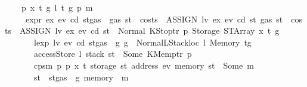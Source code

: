 \begin{isabellebody}
\ \ {\isacharbar}{\kern0pt}\ {\isacharparenleft}{\kern0pt}{}{}{\isacharparenright}{\kern0pt}\ p\ x\ t\ g\ l\ t{\isacharprime}{\kern0pt}\ g{\isacharprime}{\kern0pt}\ p{\isacharprime}{\kern0pt}\ m\isanewline
\ \ \ \ \ {\isachardoublequoteopen}expr\ ex\ ev\ cd\ {\isacharparenleft}{\kern0pt}st{\isasymlparr}gas\ {\isacharcolon}{\kern0pt}{\isacharequal}{\kern0pt}\ gas\ st\ {\isacharminus}{\kern0pt}\ costs\ \ {\isacharparenleft}{\kern0pt}ASSIGN\ lv\ ex{\isacharparenright}{\kern0pt}\ ev\ cd\ st{\isasymrparr}{\isacharparenright}{\kern0pt}\ {\isacharparenleft}{\kern0pt}gas\ st\ {\isacharminus}{\kern0pt}\ costs\ \ {\isacharparenleft}{\kern0pt}ASSIGN\ lv\ ex{\isacharparenright}{\kern0pt}\ ev\ cd\ st{\isacharparenright}{\kern0pt}\ {\isacharequal}{\kern0pt}\ Normal\ {\isacharparenleft}{\kern0pt}{\isacharparenleft}{\kern0pt}KStoptr\ p{\isacharcomma}{\kern0pt}\ Storage\ {\isacharparenleft}{\kern0pt}STArray\ x\ t{\isacharparenright}{\kern0pt}{\isacharparenright}{\kern0pt}{\isacharcomma}{\kern0pt}\ g{\isacharparenright}{\kern0pt}{\isachardoublequoteclose}\isanewline
\ \ \ \ \ \ \ {\isachardoublequoteopen}lexp\ lv\ ev\ cd\ {\isacharparenleft}{\kern0pt}st{\isasymlparr}gas\ {\isacharcolon}{\kern0pt}{\isacharequal}{\kern0pt}\ g{\isasymrparr}{\isacharparenright}{\kern0pt}\ g\ {\isacharequal}{\kern0pt}\ Normal{\isacharparenleft}{\kern0pt}{\isacharparenleft}{\kern0pt}LStackloc\ l{\isacharcomma}{\kern0pt}\ Memory\ t{\isacharprime}{\kern0pt}{\isacharparenright}{\kern0pt}{\isacharcomma}{\kern0pt}g{\isacharprime}{\kern0pt}{\isacharparenright}{\kern0pt}{\isachardoublequoteclose}\isanewline
\ \ \ \ \ \ \ {\isachardoublequoteopen}accessStore\ l\ {\isacharparenleft}{\kern0pt}stack\ st{\isacharparenright}{\kern0pt}\ {\isacharequal}{\kern0pt}\ Some\ {\isacharparenleft}{\kern0pt}KMemptr\ p{\isacharprime}{\kern0pt}{\isacharparenright}{\kern0pt}{\isachardoublequoteclose}\isanewline
\ \ \ \ \ \ \ {\isachardoublequoteopen}cps{}m\ p\ p{\isacharprime}{\kern0pt}\ x\ t\ {\isacharparenleft}{\kern0pt}storage\ st\ {\isacharparenleft}{\kern0pt}address\ ev{\isacharparenright}{\kern0pt}{\isacharparenright}{\kern0pt}\ {\isacharparenleft}{\kern0pt}memory\ st{\isacharparenright}{\kern0pt}\ {\isacharequal}{\kern0pt}\ Some\ m{\isachardoublequoteclose}\isanewline
\ \ \ \ \ \ \ {\isachardoublequoteopen}st{\isacharprime}{\kern0pt}\ {\isacharequal}{\kern0pt}\ st{\isasymlparr}gas\ {\isacharcolon}{\kern0pt}{\isacharequal}{\kern0pt}\ g{\isacharprime}{\kern0pt}{\isacharcomma}{\kern0pt}\ memory\ {\isacharcolon}{\kern0pt}{\isacharequal}{\kern0pt}\ m{\isasymrparr}{\isachardoublequoteclose}\isanewline

\end{isabellebody}
